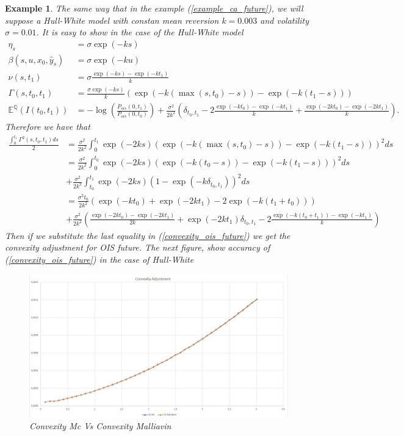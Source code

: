 \documentclass[a4paper,10pt]{article}
\newtheorem{example}[theorem]{Example}
\newcommand{\1}{\mathbf{1}}
\begin{document}
\begin{example}\label{example_convexity_hw_ois}
The same way that in the example (\ref{example_ca_future}), we will suppose a Hull-White model with constan mean reversion $k=0.003$ and volatility $\sigma=0.01$. It is easy to show in the case of the Hull-White model
\begin{align*}
\eta_s &= \sigma \exp(-ks)\\
\beta(s,u, x_0, \hat{y}_s) &= \sigma \exp(-ku) \\
\nu(s,t_1) &= \sigma \frac{\exp(-ks) - \exp(-kt_1)}{k}\\
\Gamma(s,t_0,t_1) &= \frac{\sigma \exp(-ks)}{k}\left(\exp(-k(\max(s,t_0) - s)) - \exp(-k(t_1-s))\right)\\
\mathbb{E}^{\mathbb{Q}}\left(I(t_0,t_1)\right)&=-\log\left(\frac{P_{ois}(0,t_1)}{P_{ois}(0,t_0)}\right) + \frac{\sigma^{2}}{2k^{2}}\left(\delta_{t_0,t_1} - 2 \frac{\exp(-kt_0) - \exp(-kt_1)}{k} + \frac{\exp(-2kt_0) - \exp(-2kt_1)}{k}  \right).
\end{align*}
Therefore we have that
\begin{align*}
\frac{\int_{0}^{t_1} \Gamma^{2}(s,t_0,t_1) ds}{2} &= \frac{\sigma^{2}}{2k^{2}} \int_{0}^{t_1}  \exp(-2ks)\left(\exp(-k(\max(s,t_0) - s)) - \exp(-k(t_1 - s))\right)^{2} ds \\
&= \frac{\sigma^{2}}{2k^{2}} \int_{0}^{t_0} \exp(-2ks)\left(\exp(-k(t_0 - s)) - \exp(-k(t_1 - s))\right)^{2} ds\\
&+ \frac{\sigma^{2}}{2k^{2}} \int_{t_0}^{t_1} \exp(-2ks)\left(1 - \exp(-k\delta_{t_0,t_1})\right)^{2} ds\\
&= \frac{\sigma^{2}t_0}{2k^{2}} \left( \exp(-kt_0) + \exp(-2kt_1) - 2 \exp(-k(t_1+t_0)) \right)\\  
&+ \frac{\sigma^{2}}{2k^{2}} \left(\frac{\exp(-2kt_0) - \exp(-2kt_1)}{2k} + \exp(-2kt_1)\delta_{t_0,t_1} - 2\frac{\exp(-k(t_0 + t_1)) - \exp(-kt_1)}{k}  \right)
\end{align*}
Then if we substitute the last equality in (\ref{convexity_ois_future}) we get the convexity adjustment for OIS future. The next figure, show accuracy of (\ref{convexity_ois_future}) in the case of Hull-White


\begin{figure}[h]
	\begin{center}
		\includegraphics[scale=0.3]{Figures/convexity_ois.jpg}
		\caption{Convexity Mc Vs Convexity Malliavin}
	\end{center}
\end{figure} 


\end{example}
\end{document}
